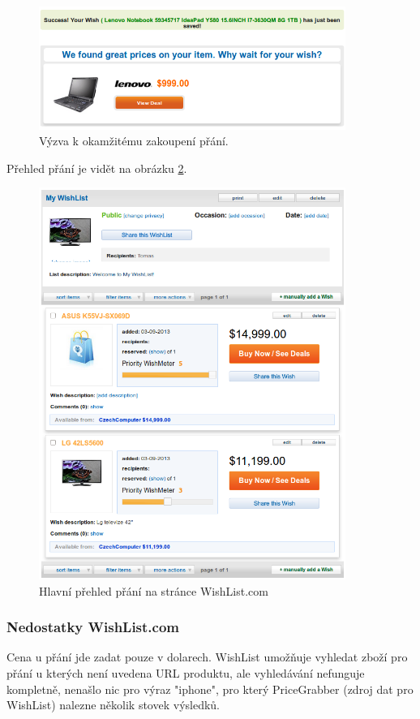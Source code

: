 \begin{figure}[htb]
\begin{center}
\includegraphics[width=100mm]{./pictures/wishlist-buynow.png}
\caption{Výzva k okamžitému zakoupení přání.}
\label{fig:wishlist-buynow}
\end{center}
\end{figure}

Přehled přání je vidět na obrázku \ref{fig:wishlist-wishlist}.

\begin{figure}[htb]
\begin{center}
\includegraphics[width=100mm]{./pictures/wishlist-wishlist.png}
\caption{Hlavní přehled přání na stránce WishList.com}
\label{fig:wishlist-wishlist}
\end{center}
\end{figure}

\subsubsection{Nedostatky WishList.com}
Cena u přání jde zadat pouze v dolarech. WishList umožňuje vyhledat zboží pro přání u kterých není uvedena URL produktu, ale vyhledávání nefunguje kompletně, nenašlo nic pro výraz "iphone", pro který PriceGrabber (zdroj dat pro WishList) nalezne několik stovek výsledků.

